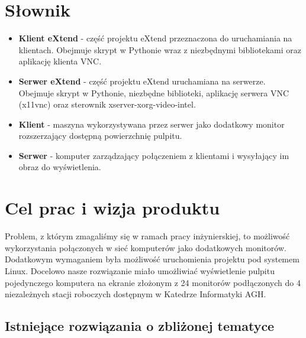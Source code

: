 

\usepackage{verbatim}

\subtitle{}
\maketitle

\tableofcontents
\vfill
\pagebreak

\section{Słownik}

  \begin{itemize}
    \item \textbf{Klient eXtend} - część projektu eXtend przeznaczona do uruchamiania na klientach. Obejmuje skrypt w Pythonie wraz z niezbędnymi bibliotekami oraz aplikację klienta VNC.
    \item \textbf{Serwer eXtend} - część projektu eXtend uruchamiana na serwerze. Obejmuje skrypt w Pythonie, niezbędne biblioteki, aplikację serwera VNC (x11vnc) oraz sterownik xserver-xorg-video-intel.
    \item \textbf{Klient} - maszyna wykorzystywana przez serwer jako dodatkowy monitor rozszerzający dostępną powierzchnię pulpitu.
    \item \textbf{Serwer} - komputer zarządzający połączeniem z klientami i wysyłający im obraz do wyświetlenia.
  \end{itemize}

\section{Cel prac i wizja produktu}

  Problem, z którym zmagaliśmy się w ramach pracy inżynierskiej, to możliwość wykorzystania połączonych w sieć komputerów jako dodatkowych monitorów. Dodatkowym wymaganiem była możliwość uruchomienia projektu pod systemem Linux. Docelowo nasze rozwiązanie miało umożliwiać wyświetlenie pulpitu pojedynczego komputera na ekranie złożonym z 24 monitorów podłączonych do 4 niezależnych stacji roboczych dostępnym w Katedrze Informatyki AGH.

  \subsection{Istniejące rozwiązania o zbliżonej tematyce}

